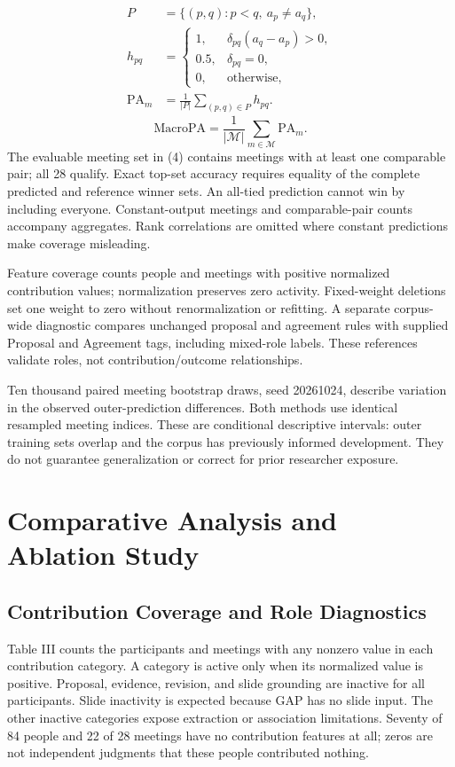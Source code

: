 \documentclass[journal]{IEEEtran}
\begin{document}
\begin{equation}
\begin{aligned}P&=\{(p,q):p<q,\ a_p\ne a_q\},\\h_{pq}&=\begin{cases}1,&\delta_{pq}(a_q-a_p)>0,\\0.5,&\delta_{pq}=0,\\0,&\text{otherwise},\end{cases}\\\mathrm{PA}_m&=\frac{1}{|P|}\sum_{(p,q)\in P}h_{pq}.\end{aligned}
\label{eq:3}
\end{equation}
\begin{equation}
\mathrm{MacroPA}=\frac{1}{|\mathcal M|}\sum_{m\in\mathcal M}\mathrm{PA}_m.
\label{eq:4}
\end{equation}
The evaluable meeting set in (4) contains meetings with at least one comparable pair; all 28 qualify. Exact top-set accuracy requires equality of the complete predicted and reference winner sets. An all-tied prediction cannot win by including everyone. Constant-output meetings and comparable-pair counts accompany aggregates. Rank correlations are omitted where constant predictions make coverage misleading.

Feature coverage counts people and meetings with positive normalized contribution values; normalization preserves zero activity. Fixed-weight deletions set one weight to zero without renormalization or refitting. A separate corpus-wide diagnostic compares unchanged proposal and agreement rules with supplied Proposal and Agreement tags, including mixed-role labels. These references validate roles, not contribution/outcome relationships.

Ten thousand paired meeting bootstrap draws, seed 20261024, describe variation in the observed outer-prediction differences. Both methods use identical resampled meeting indices. These are conditional descriptive intervals: outer training sets overlap and the corpus has previously informed development. They do not guarantee generalization or correct for prior researcher exposure.

\section{Comparative Analysis and Ablation Study}
\subsection{Contribution Coverage and Role Diagnostics}
Table III counts the participants and meetings with any nonzero value in each contribution category. A category is active only when its normalized value is positive. Proposal, evidence, revision, and slide grounding are inactive for all participants. Slide inactivity is expected because GAP has no slide input. The other inactive categories expose extraction or association limitations. Seventy of 84 people and 22 of 28 meetings have no contribution features at all; zeros are not independent judgments that these people contributed nothing.
\end{document}
